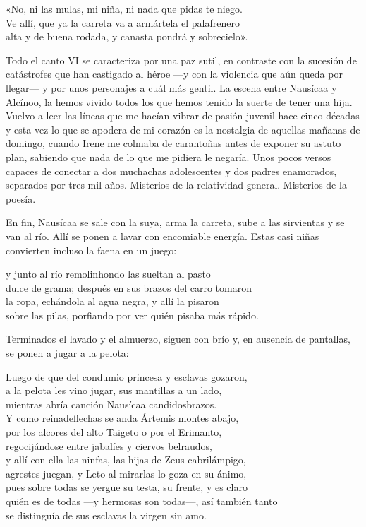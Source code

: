 \begin{versocita}
«No, ni las mulas, mi niña, ni nada que pidas te niego.\\
Ve allí, que ya la carreta va a armártela el palafrenero\\
alta y de buena rodada, y canasta pondrá y sobrecielo».
\end{versocita}

Todo el canto VI se caracteriza por una paz sutil, en contraste con la sucesión de catástrofes que han castigado al héroe ---y con la violencia que aún queda por llegar--- y por unos personajes a cuál más gentil. La escena entre Nausícaa y Alcínoo, la hemos vivido todos los que hemos tenido la suerte de tener una hija. Vuelvo a leer las líneas que me hacían vibrar de pasión juvenil hace cinco décadas y esta vez lo que se apodera de mi corazón es la nostalgia de aquellas mañanas de domingo, cuando Irene me colmaba de carantoñas antes de exponer su astuto plan, sabiendo que nada de lo que me pidiera le negaría. Unos pocos versos capaces de conectar a dos muchachas adolescentes y dos padres enamorados, separados por tres mil años. Misterios de la relatividad general. Misterios de la poesía.

En fin, Nausícaa se sale con la suya, arma la carreta, sube a las sirvientas y se van al río. Allí se ponen a lavar con encomiable energía. Estas casi niñas convierten incluso la faena en un juego:

\begin{versocita}
y junto al río remolinhondo las sueltan al pasto\\
dulce de grama; después en sus brazos del carro tomaron\\
la ropa, echándola al agua negra, y allí la pisaron\\
sobre las pilas, porfiando por ver quién pisaba más rápido.
\end{versocita}

Terminados el lavado y el almuerzo, siguen con brío y, en ausencia de pantallas, se ponen a jugar a la pelota:

\begin{versocita}
Luego de que del condumio princesa y esclavas gozaron,\\
a la pelota les vino jugar, sus mantillas a un lado,\\
mientras abría canción Nausícaa candidosbrazos.\\
Y como reinadeflechas se anda Ártemis montes abajo,\\
por los alcores del alto Taigeto o por el Erimanto,\\
regocijándose entre jabalíes y ciervos belraudos,\\
y allí con ella las ninfas, las hijas de Zeus cabrilámpigo,\\
agrestes juegan, y Leto al mirarlas lo goza en su ánimo,\\
pues sobre todas se yergue su testa, su frente, y es claro\\
quién es de todas ---y hermosas son todas---, así también tanto\\
se distinguía de sus esclavas la virgen sin amo.
\end{versocita}

